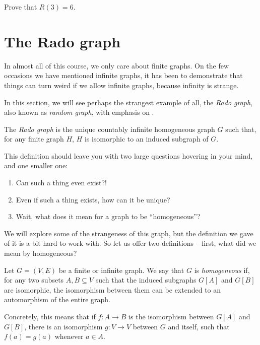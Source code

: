 \documentclass[nobib]{tufte-handout}
\begin{document}
\begin{xca}
    Prove that $R(3) = 6$.
\end{xca}

\section{The Rado graph}

In almost all of this course, we only care about finite graphs. On the few occasions we have mentioned infinite graphs, it has been to demonstrate that things can turn weird if we allow infinite graphs, because infinity is strange.

In this section, we will see perhaps the strangest example of all, the \emph{Rado graph}, also known as  \emph{random graph}, with emphasis on .

\begin{definition}
  The \emph{Rado graph} is the unique countably infinite homogeneous graph $G$ such that, for any finite graph $H$, $H$ is isomorphic to an induced subgraph of $G$.
\end{definition}

This definition should leave you with two large questions hovering in your mind, and one smaller one:
\begin{enumerate}
  \item Can such a thing even exist?!
  \item Even if such a thing exists, how can it be unique?
  \item Wait, what does it mean for a graph to be ``homogeneous''?
\end{enumerate}

We will explore some of the strangeness of this graph, but the definition we gave of it is a bit hard to work with. So let us offer two definitions -- first, what did we mean by homogeneous?

\begin{definition}
  Let $G = (V,E)$ be a finite or infinite graph. We say that $G$ is \emph{homogeneous} if, for any two subsets $A, B \subseteq V$ such that the induced subgraphs $G[A]$ and $G[B]$ are isomorphic, the isomorphism between them can be extended to an automorphism of the entire graph.

  Concretely, this means that if $f: A \to B$ is the isomorphism between $G[A]$ and $G[B]$, there is an isomorphism $g: V \to V$ between $G$ and itself, such that $f(a) = g(a)$ whenever $a \in A$.
\end{definition}
\end{document}
